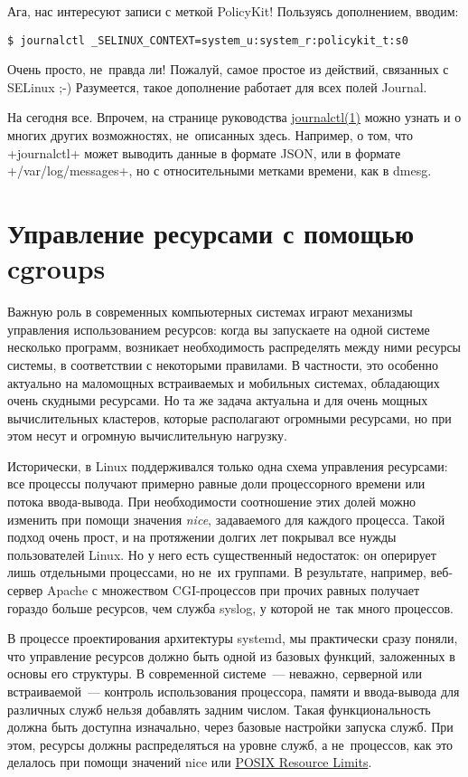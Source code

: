 \documentclass[10pt,oneside,a4paper]{article}
\begin{document}
Ага, нас интересуют записи с меткой PolicyKit! Пользуясь дополнением, вводим:
\begin{Verbatim}
$ journalctl _SELINUX_CONTEXT=system_u:system_r:policykit_t:s0	
\end{Verbatim}
Очень просто, не~правда ли! Пожалуй, самое простое из действий, связанных с
SELinux ;-) Разумеется, такое дополнение работает для всех полей Journal.

На сегодня все. Впрочем, на странице руководства
\href{http://www.freedesktop.org/software/systemd/man/journalctl.html}%
{journalctl(1)} можно узнать и о многих других возможностях, не~описанных здесь.
Например, о том, что +journalctl+ может выводить данные в формате JSON, или в
формате +/var/log/messages+, но с относительными метками времени, как в dmesg.

\section{Управление ресурсами с помощью cgroups}

Важную роль в современных компьютерных системах играют механизмы управления
использованием ресурсов: когда вы запускаете на одной системе несколько
программ, возникает необходимость распределять между ними ресурсы системы,
в соответствии с некоторыми правилами. В частности, это особенно актуально на
маломощных встраиваемых и мобильных системах, обладающих очень скудными
ресурсами. Но та же задача актуальна и для очень мощных вычислительных
кластеров, которые располагают огромными ресурсами, но при этом несут и огромную
вычислительную нагрузку.

Исторически, в Linux поддерживался только одна схема управления ресурсами: все
процессы получают примерно равные доли процессорного времени или потока
ввода-вывода. При необходимости соотношение этих долей можно изменить при
помощи значения \emph{nice}, задаваемого для каждого процесса. Такой подход
очень прост, и на протяжении долгих лет покрывал все нужды пользователей Linux.
Но у него есть существенный недостаток: он оперирует лишь отдельными процессами,
но не~их группами. В результате, например, веб-сервер Apache с множеством
CGI-процессов при прочих равных получает гораздо больше ресурсов, чем служба
syslog, у которой не~так много процессов.

В процессе проектирования архитектуры systemd, мы практически сразу поняли, что
управление ресурсов должно быть одной из базовых функций, заложенных в
основы его структуры. В современной системе~--- неважно, серверной или
встраиваемой~--- контроль использования процессора, памяти и ввода-вывода для
различных служб нельзя добавлять задним числом. Такая функциональность должна
быть доступна изначально, через базовые настройки запуска служб. При этом,
ресурсы должны распределяться на уровне служб, а не~процессов, как это делалось
при помощи значений nice или \href{http://linux.die.net/man/2/setrlimit}{POSIX
Resource Limits}.
\end{document}
